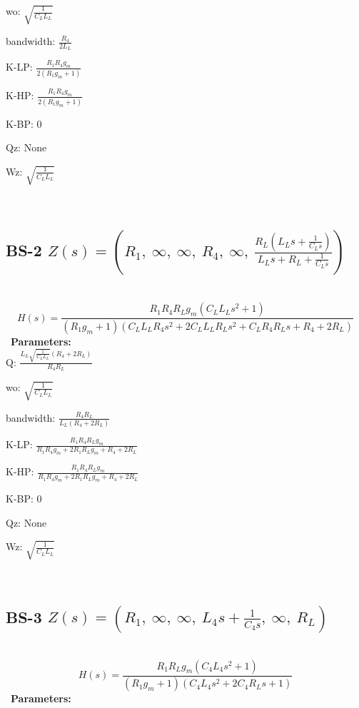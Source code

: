 \documentclass{article}
\begin{document}
wo: $\sqrt{\frac{1}{C_{L} L_{L}}}$\ 

bandwidth: $\frac{R_{4}}{2 L_{L}}$\ 

K-LP: $\frac{R_{1} R_{4} g_{m}}{2 \left(R_{1} g_{m} + 1\right)}$\ 

K-HP: $\frac{R_{1} R_{4} g_{m}}{2 \left(R_{1} g_{m} + 1\right)}$\ 

K-BP: $0$\ 

Qz: $\text{None}$\ 

Wz: $\sqrt{\frac{1}{C_{L} L_{L}}}$\ 

\ 

\subsection{BS-2 $Z(s) = \left( R_{1}, \  \infty, \  \infty, \  R_{4}, \  \infty, \  \frac{R_{L} \left(L_{L} s + \frac{1}{C_{L} s}\right)}{L_{L} s + R_{L} + \frac{1}{C_{L} s}}\right)$ } \ 
\textbf{\[H(s) = \frac{R_{1} R_{4} R_{L} g_{m} \left(C_{L} L_{L} s^{2} + 1\right)}{\left(R_{1} g_{m} + 1\right) \left(C_{L} L_{L} R_{4} s^{2} + 2 C_{L} L_{L} R_{L} s^{2} + C_{L} R_{4} R_{L} s + R_{4} + 2 R_{L}\right)}\] } \ 
\textbf{Parameters:}\\ 

Q: $\frac{L_{L} \sqrt{\frac{1}{C_{L} L_{L}}} \left(R_{4} + 2 R_{L}\right)}{R_{4} R_{L}}$\ 

wo: $\sqrt{\frac{1}{C_{L} L_{L}}}$\ 

bandwidth: $\frac{R_{4} R_{L}}{L_{L} \left(R_{4} + 2 R_{L}\right)}$\ 

K-LP: $\frac{R_{1} R_{4} R_{L} g_{m}}{R_{1} R_{4} g_{m} + 2 R_{1} R_{L} g_{m} + R_{4} + 2 R_{L}}$\ 

K-HP: $\frac{R_{1} R_{4} R_{L} g_{m}}{R_{1} R_{4} g_{m} + 2 R_{1} R_{L} g_{m} + R_{4} + 2 R_{L}}$\ 

K-BP: $0$\ 

Qz: $\text{None}$\ 

Wz: $\sqrt{\frac{1}{C_{L} L_{L}}}$\ 

\ 

\subsection{BS-3 $Z(s) = \left( R_{1}, \  \infty, \  \infty, \  L_{4} s + \frac{1}{C_{4} s}, \  \infty, \  R_{L}\right)$ } \ 
\textbf{\[H(s) = \frac{R_{1} R_{L} g_{m} \left(C_{4} L_{4} s^{2} + 1\right)}{\left(R_{1} g_{m} + 1\right) \left(C_{4} L_{4} s^{2} + 2 C_{4} R_{L} s + 1\right)}\] } \ 
\textbf{Parameters:}\\ 
\end{document}
